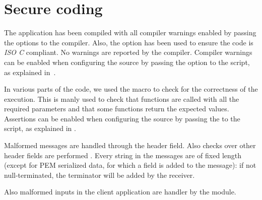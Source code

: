 \chapter{Secure coding}\label{ch:secure}

The application has been compiled with all compiler warnings enabled by passing
the  options to the compiler. Also, the 
option has been used to ensure the code is \emph{ISO C} compliant. No warnings
are reported by the compiler. Compiler warnings can be enabled when configuring
the source by passing the  option to the
 script, as explained in~.

In various parts of the code, we used the  macro to check for the
correctness of the execution. This is manly used to check that functions are
called with all the required parameters and that some functions return the
expected values. Assertions can be enabled when configuring the source by
passing the  to the  script, as
explained in .

Malformed messages are handled through the  header field. Also
checks over other header fields are performed . Every string in the messages are of fixed length (except
for PEM serialized data, for which a  field is added to the message):
if not null-terminated, the terminator will be added by the receiver.

Also malformed inputs in the client application are handler by the 
module.


